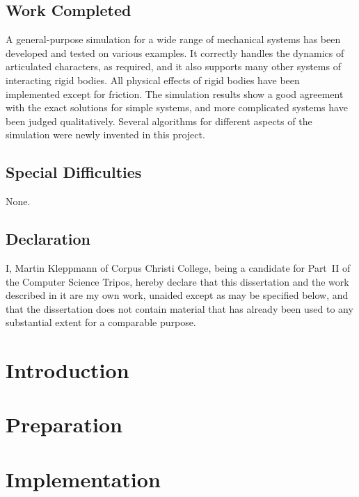 \documentclass[11pt,a4paper,twoside,notitlepage]{report}
\begin{document}
\section*{Work Completed}
A general-purpose simulation for a wide range of mechanical systems has been developed and tested
on various examples. It correctly handles the dynamics of articulated characters, as required,
and it also supports many other systems of interacting rigid bodies. All physical effects
of rigid bodies have been implemented except for friction. The simulation results show a good
agreement with the exact solutions for simple systems, and more complicated systems have been
judged qualitatively. Several algorithms for different aspects of the simulation were newly
invented in this project.

\section*{Special Difficulties}
None.

\newpage
\vspace*{60mm}
\section*{Declaration}

I, Martin Kleppmann of Corpus Christi College, being a candidate for Part~II of the Computer
Science Tripos, hereby declare that this dissertation and the work described in it are my own
work, unaided except as may be specified below, and that the dissertation does not contain
material that has already been used to any substantial extent for a comparable purpose.

\vspace{20mm}
\vspace{12mm}
\cleardoublepage

\tableofcontents
\chapter{Introduction}

\chapter{Preparation}




\chapter{Implementation}


\end{document}

